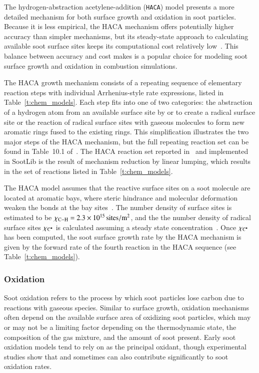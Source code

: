 \documentclass[preprint,letterpaper]{elsarticle}
\begin{document}
The hydrogen-abstraction acetylene-addition (\texttt{HACA}) model presents a more detailed mechanism for both surface growth and oxidation in soot particles. Because it is less empirical, the HACA mechanism offers potentially higher accuracy than simpler mechanisms, but its steady-state approach to calculating available soot surface sites keeps its computational cost relatively low~\cite{Appel_2000}. This balance between accuracy and cost makes is a popular choice for modeling soot surface growth and oxidation in combustion simulations.

The HACA growth mechanism consists of a repeating sequence of elementary reaction steps with individual Arrhenius-style rate expressions, listed in Table~\ref{t:chem_models}. Each step fits into one of two categories: the abstraction of a hydrogen atom from an available surface site by  or  to create a radical surface site or the reaction of radical surface sites with gaseous  molecules to form new aromatic rings fused to the existing rings. This simplification illustrates the two major steps of the HACA mechanism, but the full repeating reaction set can be found in Table~10.1 of~\cite{Frenklach_1994}. The HACA reaction set reported in~\cite{Appel_2000} and implemented in SootLib is the result of mechanism reduction by linear lumping, which results in the set of reactions listed in Table~\ref{t:chem_models}.

The HACA model assumes that the reactive  surface sites on a soot molecule are located at aromatic bays, where steric hindrance and molecular deformation weaken the  bonds at the bay sites~\cite{Appel_2000}. The number density of  surface sites is estimated to be $\chi_{\ce{C-H}}=\qty{2.3e15}{sites\per\square\m}$, and the the number density of radical surface sites $\chi_{\ce{C^.}}$ is calculated assuming a steady state concentration~\cite{Frenklach_1991,Appel_2000}. Once $\chi_{\ce{C^.}}$ has been computed, the soot surface growth rate by the HACA mechanism is given by the forward rate of the fourth reaction in the HACA sequence (see Table~\ref{t:chem_models}).

\subsubsection{Oxidation}
\label{s:oxi}

Soot oxidation refers to the process by which soot particles lose carbon due to reactions with gaseous species. Similar to surface growth, oxidation mechanisms often depend on the available surface area of oxidizing soot particles, which may or may not be a limiting factor depending on the thermodynamic state, the composition of the gas mixture, and the amount of soot present. Early soot oxidation models tend to rely on  as the principal oxidant, though experimental studies show that  and sometimes  can also contribute significantly to soot oxidation rates.
\end{document}
